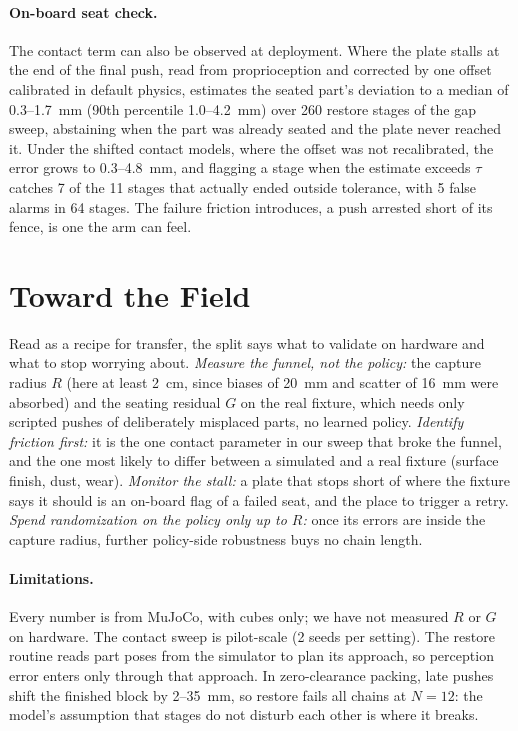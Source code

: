 \documentclass{article}
\begin{document}
\paragraph{On-board seat check.} The contact term can also be observed at deployment. Where the plate stalls at the
end of the final push, read from proprioception and corrected by one offset calibrated in default physics, estimates
the seated part's deviation to a median of 0.3--1.7~mm (90th percentile 1.0--4.2~mm) over 260 restore stages of the
gap sweep, abstaining when the part was already seated and the plate never reached it. Under the shifted contact
models, where the offset was not recalibrated, the error grows to 0.3--4.8~mm, and flagging a stage when the estimate
exceeds $\tau$ catches 7 of the 11 stages that actually ended outside tolerance, with 5 false alarms in 64 stages. The failure friction introduces, a push arrested short of
its fence, is one the arm can feel.

\section{Toward the Field}
\label{sec:field}
Read as a recipe for transfer, the split says what to validate on hardware and what to stop worrying about.
\textit{Measure the funnel, not the policy:} the capture radius $R$ (here at least 2~cm, since biases of 20~mm and
scatter of 16~mm were absorbed) and the seating residual $G$ on the real fixture, which needs only scripted pushes of
deliberately misplaced parts, no learned policy. \textit{Identify friction first:} it is the one contact parameter
in our sweep that broke the funnel, and the one most likely to differ between a simulated and a real fixture
(surface finish, dust, wear). \textit{Monitor the stall:} a plate that stops short of where the fixture says it
should is an on-board flag of a failed seat, and the place to trigger a retry. \textit{Spend randomization on the
policy only up to $R$:} once its errors are inside the capture radius, further policy-side robustness buys no chain
length.

\paragraph{Limitations.} Every number is from MuJoCo, with cubes only; we have not measured $R$ or $G$ on hardware.
The contact sweep is pilot-scale (2 seeds per setting). The restore routine reads part poses from the simulator to
plan its approach, so perception error enters only through that approach. In zero-clearance packing, late pushes
shift the finished block by 2--35~mm, so restore fails all chains at $N=12$: the model's assumption that stages do
not disturb each other is where it breaks.
\end{document}
